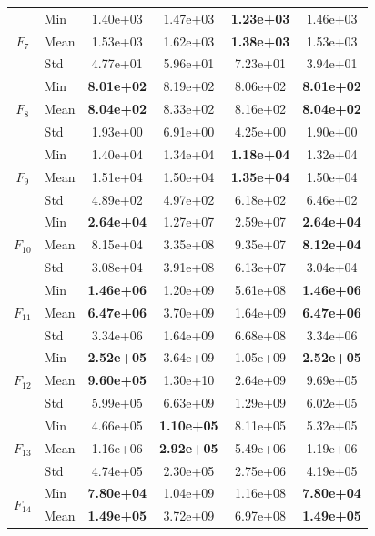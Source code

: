 \begin{center}
\begin{longtable}{clcccc}
\midrule
\multirow{3}{*}{$F_{7}$} & Min & 1.40e+03 & 1.47e+03 & \textbf{1.23e+03} & 1.46e+03 \\
 & Mean & 1.53e+03 & 1.62e+03 & \textbf{1.38e+03} & 1.53e+03 \\
 & Std & 4.77e+01 & 5.96e+01 & 7.23e+01 & 3.94e+01 \\
\midrule
\multirow{3}{*}{$F_{8}$} & Min & \textbf{8.01e+02} & 8.19e+02 & 8.06e+02 & \textbf{8.01e+02} \\
 & Mean & \textbf{8.04e+02} & 8.33e+02 & 8.16e+02 & \textbf{8.04e+02} \\
 & Std & 1.93e+00 & 6.91e+00 & 4.25e+00 & 1.90e+00 \\
\midrule
\multirow{3}{*}{$F_{9}$} & Min & 1.40e+04 & 1.34e+04 & \textbf{1.18e+04} & 1.32e+04 \\
 & Mean & 1.51e+04 & 1.50e+04 & \textbf{1.35e+04} & 1.50e+04 \\
 & Std & 4.89e+02 & 4.97e+02 & 6.18e+02 & 6.46e+02 \\
\midrule
\multirow{3}{*}{$F_{10}$} & Min & \textbf{2.64e+04} & 1.27e+07 & 2.59e+07 & \textbf{2.64e+04} \\
 & Mean & 8.15e+04 & 3.35e+08 & 9.35e+07 & \textbf{8.12e+04} \\
 & Std & 3.08e+04 & 3.91e+08 & 6.13e+07 & 3.04e+04 \\
\midrule
\multirow{3}{*}{$F_{11}$} & Min & \textbf{1.46e+06} & 1.20e+09 & 5.61e+08 & \textbf{1.46e+06} \\
 & Mean & \textbf{6.47e+06} & 3.70e+09 & 1.64e+09 & \textbf{6.47e+06} \\
 & Std & 3.34e+06 & 1.64e+09 & 6.68e+08 & 3.34e+06 \\
\midrule
\multirow{3}{*}{$F_{12}$} & Min & \textbf{2.52e+05} & 3.64e+09 & 1.05e+09 & \textbf{2.52e+05} \\
 & Mean & \textbf{9.60e+05} & 1.30e+10 & 2.64e+09 & 9.69e+05 \\
 & Std & 5.99e+05 & 6.63e+09 & 1.29e+09 & 6.02e+05 \\
\midrule
\multirow{3}{*}{$F_{13}$} & Min & 4.66e+05 & \textbf{1.10e+05} & 8.11e+05 & 5.32e+05 \\
 & Mean & 1.16e+06 & \textbf{2.92e+05} & 5.49e+06 & 1.19e+06 \\
 & Std & 4.74e+05 & 2.30e+05 & 2.75e+06 & 4.19e+05 \\
\midrule
\multirow{3}{*}{$F_{14}$} & Min & \textbf{7.80e+04} & 1.04e+09 & 1.16e+08 & \textbf{7.80e+04} \\
 & Mean & \textbf{1.49e+05} & 3.72e+09 & 6.97e+08 & \textbf{1.49e+05} \\

\end{longtable}
\end{center}
